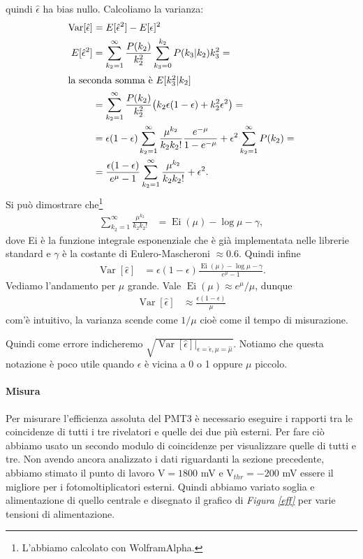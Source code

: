 \documentclass[a4paper]{article}
\begin{document}
quindi $\hat\epsilon$ ha bias nullo.
Calcoliamo la varianza:
\begin{align*}
	\operatorname{Var}[\hat\epsilon]
	&= E[\hat\epsilon^2] - E[\epsilon]^2 \\
	E[\hat\epsilon^2]
	&= \sum_{k_2=1}^\infty \frac{P(k_2)}{k_2^2}
	\sum_{k_3=0}^{k_2} P(k_3|k_2) k_3^2 = \\
	\intertext{la seconda somma è $E[k_3^2|k_2]$}
	&= \sum_{k_2=1}^\infty \frac{P(k_2)}{k_2^2}
	\big (k_2\epsilon(1-\epsilon) + k_2^2\epsilon^2 \big) = \\
	&= \epsilon(1-\epsilon) \sum_{k_2=1}^\infty \frac{\mu^{k_2}}{k_2k_2!}\frac{e^{-\mu}}{1-e^{-\mu}}
	+ \epsilon^2 \sum_{k_2=1}^\infty P(k_2) = \\
	&= \frac{\epsilon(1-\epsilon)}{e^{\mu}-1} \sum_{k_2=1}^\infty \frac{\mu^{k_2}}{k_2k_2!} + \epsilon^2.
\end{align*}
Si può dimostrare che\footnote{L'abbiamo calcolato con WolframAlpha.}
\begin{align*}
	\sum_{k_2=1}^\infty \frac{\mu^{k_2}}{k_2k_2!}
	&= \operatorname{Ei}(\mu) - \log\mu - \gamma,
\end{align*}
dove Ei è la funzione integrale esponenziale che è già implementata nelle librerie standard
e $\gamma$ è la costante di Eulero-Mascheroni $\approx 0.6$.
Quindi infine
\begin{align*}
	\operatorname{Var}[\hat\epsilon]
	&= \epsilon(1-\epsilon)\frac{\operatorname{Ei}(\mu) - \log\mu - \gamma}{e^\mu - 1}.
\end{align*}
Vediamo l'andamento per $\mu$ grande.
Vale $\operatorname{Ei}(\mu) \approx e^{\mu}/\mu$, dunque
\begin{align*}
	\operatorname{Var}[\hat\epsilon]
	&\approx \frac{\epsilon(1-\epsilon)}{\mu}
\end{align*}
com'è intuitivo, la varianza scende come $1/\mu$ cioè come il tempo di misurazione.

Quindi come errore indicheremo $\sqrt{\operatorname{Var}[\hat\epsilon]\big|_{\epsilon=\hat\epsilon,\mu=\hat\mu}}$.
Notiamo che questa notazione è poco utile quando $\epsilon$ è vicina a 0 o 1 oppure $\mu$ piccolo.

\paragraph{Misura}

Per misurare l'efficienza assoluta del PMT3 è necessario eseguire i rapporti tra le coincidenze di tutti i tre rivelatori e quelle dei due più esterni. Per fare ciò abbiamo usato un secondo modulo di coincidenze per visualizzare quelle di tutti e tre. Non avendo ancora analizzato i dati riguardanti la sezione precedente, abbiamo stimato il punto di lavoro V$=1800$\! mV e V$_{thr}=-200$\! mV essere il migliore per i fotomoltiplicatori esterni. Quindi abbiamo variato soglia e alimentazione di quello centrale e disegnato il grafico di \emph{Figura \ref{eff}} per varie tensioni di alimentazione.
\end{document}
